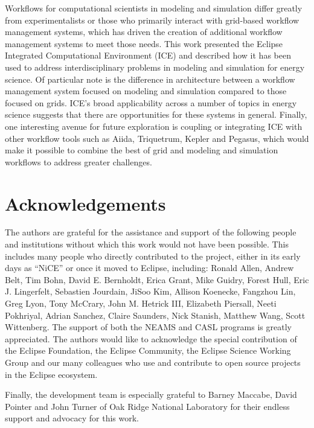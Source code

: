 Workflows for computational scientists in modeling and simulation differ
greatly from experimentalists or those who primarily interact with
grid-based workflow management systems, which has driven the creation of
additional workflow management systems to meet those needs. This work 
presented the Eclipse Integrated Computational Environment (ICE) and 
described how it has been used to address interdisciplinary problems in 
modeling and simulation for energy science. Of particular note is the
difference in architecture between a workflow management system focused
on modeling and simulation compared to those focused on grids. ICE's broad
applicability across a number of topics in energy science suggests that
there are opportunities for these systems in general. Finally, one 
interesting avenue for future exploration is coupling or integrating ICE 
with other workflow tools such as Aiida, Triquetrum, Kepler and Pegasus,
which would make it possible to combine the best of grid and modeling and
simulation workflows to address greater challenges.

\section*{Acknowledgements}\label{acknowledgements}

The authors are grateful for the assistance and support of the following
people and institutions without which this work would not have been
possible. This includes many people who directly contributed to the
project, either in its early days as ``NiCE'' or once it moved to
Eclipse, including: Ronald Allen, Andrew Belt, Tim Bohn, David E.
Bernholdt, Erica Grant, Mike Guidry, Forest Hull, Eric J. Lingerfelt,
Sebastien Jourdain, JiSoo Kim, Allison Koenecke, Fangzhou Lin, Greg
Lyon, Tony McCrary, John M. Hetrick III, Elizabeth Piersall, Neeti
Pokhriyal, Adrian Sanchez, Claire Saunders, Nick Stanish, Matthew Wang,
Scott Wittenberg. The support of both the NEAMS and CASL programs is
greatly appreciated. The authors would like to acknowledge the special
contribution of the Eclipse Foundation, the Eclipse Community, the
Eclipse Science Working Group and our many colleagues who use and
contribute to open source projects in the Eclipse ecosystem.

Finally, the development team is especially grateful to Barney Maccabe,
David Pointer and John Turner of Oak Ridge National Laboratory for their
endless support and advocacy for this work.

